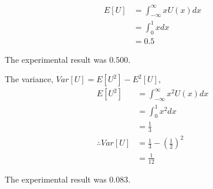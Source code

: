 \documentclass[journal,12pt,twocolumn]{IEEEtran}
\providecommand{\brak}[1]{\ensuremath{\left(#1\right)}}
\theoremstyle{remark}
\numberwithin{equation}{section}
\numberwithin{equation}{section}
\begin{document}
\begin{align}
    E[U] &= \int_{-\infty}^\infty x U(x) dx \nonumber \\
    &= \int_0^1 x dx \nonumber \\
    &= 0.5
\end{align}

The experimental result was $0.500$.

The variance, $Var[U] = E[U^2] - E^2[U]$,
\begin{align}
    E[U^2] &= \int_{-\infty}^\infty x^2 U(x) dx \nonumber \\
    &= \int_0^1 x^2 dx \nonumber \\
    &= \frac{1}{3} \\
    \therefore Var[U] &= \frac{1}{3} - \brak{\frac{1}{2}}^2 \nonumber \\
    &= \frac{1}{12}
\end{align}

The experimental result was $0.083$.

\newpage
\end{document}
